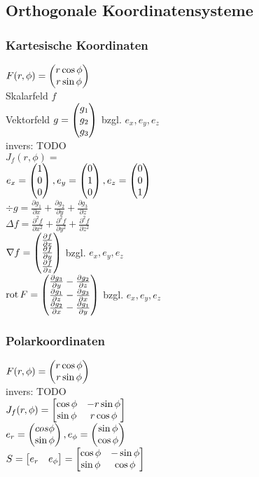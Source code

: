\documentclass[german]{latex4ei/latex4ei_sheet}
\begin{document}
\subsection{Orthogonale Koordinatensysteme}
\subsubsection{Kartesische Koordinaten}
$F(r,\phi)=\begin{pmatrix} r \cos \phi \\ r \sin \phi \end{pmatrix}$\\
Skalarfeld $f$\\
Vektorfeld $g=\begin{pmatrix} g_1\\g_2\\g_3 \end{pmatrix}$ bzgl. $e_x,e_y,e_z$\\
invers: TODO\\
$J_f(r,\phi)=$\\
$e_x=\begin{pmatrix} 1\\0\\0 \end{pmatrix},e_y=\begin{pmatrix} 0\\1\\0 \end{pmatrix},e_z=\begin{pmatrix} 0\\0\\1 \end{pmatrix}$\\
$\div g=\frac{\partial g_1}{\partial x}+ \frac{\partial g_2}{\partial y}+\frac{\partial g_3}{\partial z}$\\
$\Delta  f=\frac{\partial^2 f}{\partial x^2}+\frac{\partial^2 f}{\partial y^2}+\frac{\partial^2 f}{\partial z^2}$\\
$\nabla f=\begin{pmatrix} \frac{\partial f}{\partial x	}\\\frac{\partial f}{\partial y}\\\frac{\partial f}{\partial z	} \end{pmatrix}$ bzgl. $e_x,e_y,e_z$\\
$\operatorname{rot} F=\begin{pmatrix} \frac{\partial g_3}{\partial y} - \frac{\partial g_2}{\partial z}\\\frac{\partial g_1}{\partial z} - \frac{\partial g_3}{\partial x}\\\frac{\partial g_2}{\partial x} - \frac{\partial g_1}{\partial y} \end{pmatrix}$ bzgl. $e_x,e_y,e_z$\\

\subsubsection{Polarkoordinaten}
$F(r,\phi)=\begin{pmatrix} r \cos \phi \\ r \sin \phi \end{pmatrix}$\\

invers: TODO\\
$J_f(r,\phi)=\mat{\cos \phi & - r \sin \phi \\ \sin \phi & r \cos \phi}$\\
$e_r=\begin{pmatrix} cos \phi \\ \sin \phi \end{pmatrix}, e_\phi=\begin{pmatrix} \sin \phi \\ \cos \phi \end{pmatrix}$\\
$S=\mat{e_r & e_\phi}=\mat{\cos \phi & - \sin \phi \\ \sin \phi & \cos \phi}$\\
\end{document}
